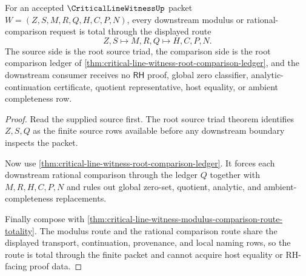 \begin{theorem}
\label{thm:critical-line-witness-downstream-modulus-comparison-totality}
For an accepted $\CriticalLineWitnessUp$ packet $W=(Z,S,M,R,Q,H,C,P,N)$, every downstream modulus or rational-comparison request is total through the displayed route
$$
Z,S \longmapsto M,R,Q \longmapsto H,C,P,N.
$$
The source side is the root source triad, the comparison side is the root comparison ledger of \autoref{thm:critical-line-witness-root-comparison-ledger}, and the downstream consumer receives no $\mathsf{RH}$ proof, global zero classifier, analytic-continuation certificate, quotient representative, host equality, or ambient completeness row.
\end{theorem}
\begin{proof}
Read the supplied source first. The root source triad theorem identifies $Z,S,Q$ as the finite source rows available before any downstream boundary inspects the packet.

Now use \autoref{thm:critical-line-witness-root-comparison-ledger}. It forces each downstream rational comparison through the ledger $Q$ together with $M,R,H,C,P,N$ and rules out global zero-set, quotient, analytic, and ambient-completeness replacements.

Finally compose with \autoref{thm:critical-line-witness-modulus-comparison-route-totality}. The modulus route and the rational comparison route share the displayed transport, continuation, provenance, and local naming rows, so the route is total through the finite packet and cannot acquire host equality or RH-facing proof data.
\end{proof}

